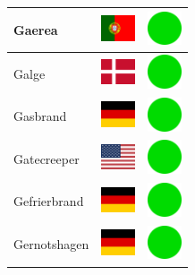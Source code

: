 \documentclass[12pt, a4paper, twoside]{report}
\begin{document}
\begin{center}
\begin{longtable}{|p{5cm}|p{2cm}|p{2cm}|}
 Gaerea                                                     & \includegraphics[width=1cm]{../img/flags/pt} &   \includegraphics[width=1cm]{../likes/y} \\ \hline
 Galge                                                      & \includegraphics[width=1cm]{../img/flags/dk} &   \includegraphics[width=1cm]{../likes/y} \\ \hline
 Gasbrand                                                   & \includegraphics[width=1cm]{../img/flags/de} &   \includegraphics[width=1cm]{../likes/y} \\ \hline
 Gatecreeper                                                & \includegraphics[width=1cm]{../img/flags/us} &   \includegraphics[width=1cm]{../likes/y} \\ \hline
 Gefrierbrand                                               & \includegraphics[width=1cm]{../img/flags/de} &   \includegraphics[width=1cm]{../likes/y} \\ \hline
 Gernotshagen                                               & \includegraphics[width=1cm]{../img/flags/de} &   \includegraphics[width=1cm]{../likes/y} \\ \hline

\end{longtable}
\end{center}
\end{document}
